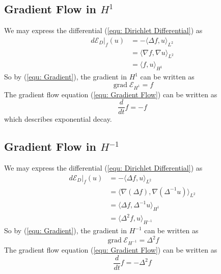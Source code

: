 \documentclass[a4paper]{article}
\theoremstyle{definition}
\DeclareMathOperator{\grad}{grad}
\begin{document}
\subsection{Gradient Flow in $H^1$}
We may express the differential (\ref{equ: Dirichlet Differential}) as
\begin{align}
    d \mathcal{E}_D|_f (u) &= - \langle \Delta f, u \rangle_{L^2} \\
    &= \langle \nabla f, \nabla u \rangle_{L^2} \\
    &= \langle f, u \rangle_{H^1}
    \label{equ: Gradient H1 Derivation}
\end{align}
So by (\ref{equ: Gradient}), the gradient in $H^1$ can be written as
\begin{equation}
    \grad \mathcal{E}_{H^1} = f
    \label{equ: H1 Gradient}
\end{equation}
The gradient flow equation (\ref{equ: Gradient Flow}) can be written as
\begin{equation}
    \frac{d}{dt}f = -f
    \label{equ: H1 Gradient Flow}
\end{equation}
which describes exponential decay.

\subsection{Gradient Flow in $H^{-1}$}
We may express the differential (\ref{equ: Dirichlet Differential}) as
\begin{align}
    d \mathcal{E}_D|_f (u) &= - \langle \Delta f, u \rangle_{L^2} \\
    &= \langle \nabla \left( \Delta f \right), \nabla \left( \Delta^{-1} u \right) \rangle_{L^2} \\
    &= \langle \Delta f, \Delta^{-1} u \rangle_{H^1} \\
    &= \langle \Delta^2 f, u \rangle_{H^{-1}}
    \label{equ: Gradient H-1 Derivation}
\end{align}
So by (\ref{equ: Gradient}), the gradient in $H^{-1}$ can be written as
\begin{equation}
    \grad \mathcal{E}_{H^{-1}} = \Delta^2 f
    \label{equ: H-1 Gradient}
\end{equation}
The gradient flow equation (\ref{equ: Gradient Flow}) can be written as
\begin{equation}
    \frac{d}{dt}f = - \Delta^2 f
    \label{equ: H-1 Gradient Flow}
\end{equation}
\end{document}
